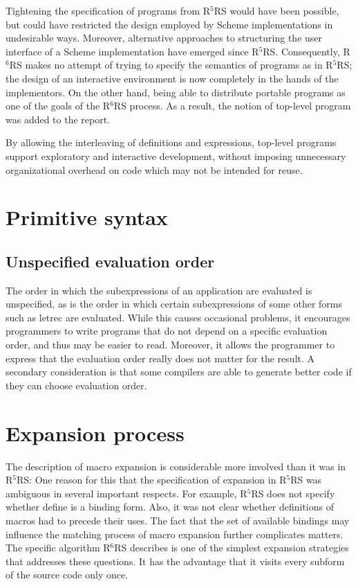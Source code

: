 \documentclass[twoside,twocolumn]{algol60}
\newcommand{\rn}[1]{R$^{#1}$RS}
\begin{document}
Tightening the specification of programs from \rn{5} would have been
possible, but could have restricted the design employed by Scheme
implementations in undesirable ways.  Moreover, alternative approaches
to structuring the user interface of a Scheme implementation have
emerged since \rn{5}.  Consequently, \rn{6} makes no attempt of trying
to specify the semantics of programs as in \rn{5}; the design of an
interactive environment is now completely in the hands of the
implementors.  On the other hand, being able to distribute portable
programs as one of the goals of the \rn{6} process.  As a result, the
notion of top-level program was added to the report.

By allowing the interleaving of definitions and expressions, top-level 
programs support exploratory and interactive development, without 
imposing unnecessary organizational overhead on code which may not be 
intended for reuse.

\chapter{Primitive syntax}

\section{Unspecified evaluation order}

The order in which the subexpressions of an application are evaluated
is unspecified, as is the order in which certain subexpressions of
some other forms such as {\cf letrec} are evaluated.  While this
causes occasional problems, it encourages programmers to write
programs that do not depend on a specific evaluation order, and thus
may be easier to read.  Moreover, it allows the programmer to express
that the evaluation order really does not matter for the result.  A
secondary consideration is that some compilers are able to generate
better code if they can choose evaluation order.


\chapter{Expansion process}

The description of macro expansion is considerable more involved than
it was in \rn{5}: One reason for this that the specification of
expansion in \rn{5} was ambiguous in several important respects.  For
example, \rn{5} does not specify whether {\cf define} is a binding
form.  Also, it was not clear whether definitions of macros had to
precede their uses.  The fact that the set of available bindings may
influence the matching process of macro expansion further complicates
matters.  The specific algorithm \rn{6} describes is one of the
simplest expansion strategies that addresses these questions.  It has
the advantage that it visits every subform of the source code only
once.
\end{document}
